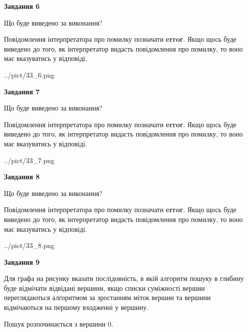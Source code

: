 \documentclass[12pt, ukrainian]{article}
\begin{document}
{\begin {large}
{\begin {center}\textbf{Завдання 6}\end {center}}\par
Що буде виведено за виконання?

Повідомлення інтерпретатора про помилку позначати \textbf{error}.
Якщо щось буде виведено до того, як інтерпретатор видасть повідомлення про помилку, 
то воно має вказуватись у відповіді. \par


\begin{center}
	{../pict/33_6.png}
\end{center}
\newpage

{\begin {center}\textbf{Завдання 7}\end {center}}\par
Що буде виведено за виконання?

Повідомлення інтерпретатора про помилку позначати \textbf{error}.
Якщо щось буде виведено до того, як інтерпретатор видасть повідомлення про помилку, 
то воно має вказуватись у відповіді. \par


\begin{center}
	{../pict/33_7.png}
\end{center}
\newpage

{\begin {center}\textbf{Завдання 8}\end {center}}\par
Що буде виведено за виконання?

Повідомлення інтерпретатора про помилку позначати \textbf{error}.
Якщо щось буде виведено до того, як інтерпретатор видасть повідомлення про помилку, 
то воно має вказуватись у відповіді. \par


\begin{center}
	{../pict/33_8.png}
\end{center}
\newpage

{\begin {center}\textbf{Завдання 9}\end {center}}\par
Для графа на рисунку вказати послідовність, в якій алгоритм пошуку в глибину буде відмічати відвідані вершини, якщо списки суміжності вершин переглядаються алгоритмом за зростанням міток вершин та вершини відмічаються на першому вход\-женні у вершину.\par
Пошук розпочинається з вершини 0.\par


\end{large}}
\end{document}

